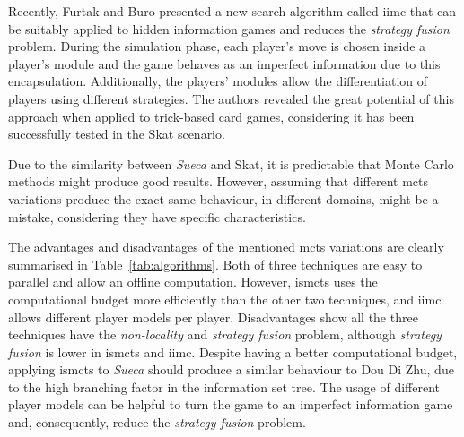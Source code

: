 Recently, Furtak and Buro \cite{Furtak} presented a new search algorithm called \gls{iimc} that can be suitably applied to hidden information games and reduces the \emph{strategy fusion} problem.
During the simulation phase, each player's move is chosen inside a player's module and the game behaves as an imperfect information due to this encapsulation.
Additionally, the players' modules allow the differentiation of players using different strategies.
The authors revealed the great potential of this approach when applied to trick-based card games, considering it has been successfully tested in the Skat scenario.

\bigskip

Due to the similarity between \emph{Sueca} and Skat, it is predictable that Monte Carlo methods might produce good results.
However, assuming that different \gls{mcts} variations produce the exact same behaviour, in different domains, might be a mistake, considering they have specific characteristics.

The advantages and disadvantages of the mentioned \gls{mcts} variations are clearly summarised in Table~\ref{tab:algorithms}.
Both of three techniques are easy to parallel and allow an offline computation. However, \gls{ismcts} uses the computational budget more efficiently than the other two techniques, and \gls{iimc} allows different player models per player.
Disadvantages show all the three techniques have the \emph{non-locality} and \emph{strategy fusion} problem, although \emph{strategy fusion} is lower in \gls{ismcts} and \gls{iimc}.
Despite having a better computational budget, applying \gls{ismcts} to \emph{Sueca} should produce a similar behaviour to Dou Di Zhu, due to the high branching factor in the information set tree.
The usage of different player models can be helpful to turn the game to an imperfect information game and, consequently, reduce the \emph{strategy fusion} problem.


